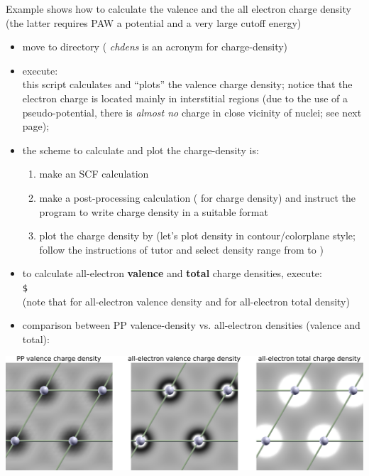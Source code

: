 \documentclass[landscape]{foils}
\def\indent{\hspace*{1cm}}
\def\prompt{\texttt{\$~}}
\def\exec#1{\indent\prompt\code{#1}}
\begin{document}
%
Example  shows how to calculate
the valence and the all electron charge density (the latter requires PAW
a potential and a very large cutoff energy)
\begin{itemize}
\item move to  directory ({\it
    chdens} is an acronym for charge-density)
\item execute: ~\\
  this script calculates and ``plots'' the valence charge density;
  notice that the electron charge is located mainly in interstitial
  regions (due to the use of a pseudo-potential, there is {\it almost
    no} charge in close vicinity of nuclei; see next page);
\item the scheme to calculate and plot the charge-density is:
  \begin{enumerate}
  \item make an SCF  calculation
  \item make a post-processing  calculation
    ( for charge density) and instruct the program to
    write charge density in a suitable format
  \item plot the charge density by  (let's plot density
    in contour/colorplane style; follow the instructions of tutor and
    select density range from  to )
  \end{enumerate}
\end{itemize}


\begin{itemize}
\item to calculate all-electron {\bf valence} and {\bf total} charge densities,
  execute:\\[0.5em]
  \exec{pwtk 2-chdens-paw.pwtk}\\[0.5em]
  (note that  for all-electron valence density and
   for all-electron total density)

\item comparison between PP valence-density vs.\@{} all-electron densities
  (valence and total):
\end{itemize}
\centerline{\includegraphics[width=1.0\textwidth]{figs/Al-chdens.pdf}}
\end{document}
